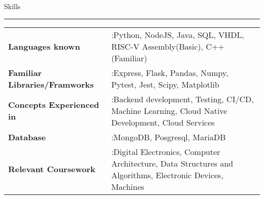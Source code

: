 \documentclass[10pt, hidelinks]{article}
\begin{document}

	{\large\color{RoyalBlue}Skills}
	\par\noindent\rule[7pt]{\textwidth}{0.1pt}
	\begin{center}
		{\small \vspace*{-5mm}
		\begin{tabular}{ m{} m{}}
			\textbf{Languages known} & :Python, NodeJS, Java, SQL, VHDL, RISC-V Assembly(Basic), C++(Familiar) \\
			\textbf{Familiar Libraries/Framworks} & :Express, Flask, Pandas, Numpy, Pytest, Jest, Scipy, Matplotlib \\
			\textbf{Concepts Experienced in} & :Backend development, Testing, CI/CD, Machine Learning, Cloud Native Development, Cloud Services \\
			\textbf{Database} & :MongoDB, Posgresql, MariaDB \\
			\textbf{Relevant Coursework} & :Digital Electronics, Computer Architecture, Data Structures and Algorithms, Electronic Devices, Machines \\
		\end{tabular}
		}
	\end{center}
\end{document}

